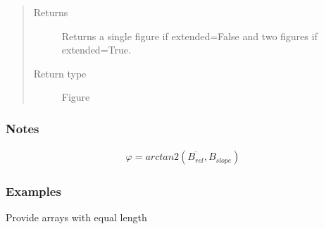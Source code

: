 \documentclass[letterpaper,10pt,english]{sphinxmanual}
\begin{document}
\begin{fulllineitems}
\begin{quote}
\begin{description}
\begin{itemize}
\end{itemize}

\item[{Returns}] \leavevmode
{} \textendash{} Returns a single figure if extended=False and two figures if
extended=True.

\item[{Return type}] \leavevmode
Figure

\end{description}\end{quote}
\subsubsection*{Notes}
\begin{equation*}
\begin{split}\varphi = arctan2(\overline{B_{rel}}, B_{slope})\end{split}
\end{equation*}\subsubsection*{Examples}

Provide arrays with equal length

\begin{sphinxVerbatim}[commandchars=\\\{\}]
   
   
  \PYG{p}{[}     \PYG{p}{]}
  \PYG{p}{[}     \PYG{p}{]}
 
\end{sphinxVerbatim}

\end{fulllineitems}
\end{document}
